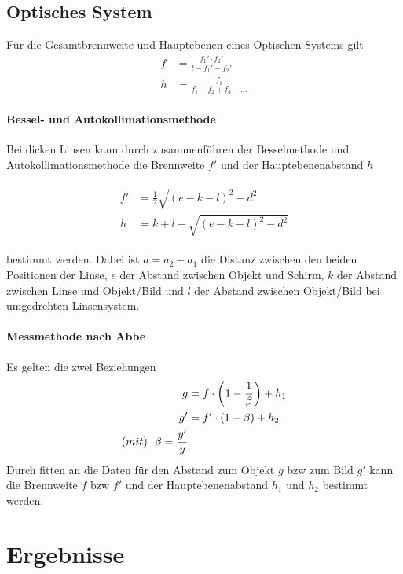 \documentclass[11pt, a4paper]{article}
\begin{document}
    \subsection{Optisches System}

    Für die Gesamtbrennweite und Hauptebenen eines Optischen Systems gilt
    \begin{align}
        f &= \frac{f_1' \cdot f_2'}{t - f_1' - f_2'} \label{eq:brenn}\\
        h &= \frac{f_1}{f_1 + f_2 + f_3 + \dots} \label{eq:ebene}
    \end{align}

    \paragraph*{Bessel- und Autokollimationsmethode}
    Bei dicken Linsen kann durch zusammenführen der Besselmethode und Autokollimationsmethode die Brennweite $f'$ und der Hauptebenenabstand $h$
    
    \begin{align} \begin{split} \label{eq:dicke}
        f' &= \frac{1}{2} \sqrt{(e-k-l)^2 - d^2} \\
        h &= k + l - \sqrt{(e-k-l)^2 - d^2} \end{split}
    \end{align}
        
    bestimmt werden. Dabei ist $d = a_2 - a_1$ die Distanz zwischen den beiden Positionen der Linse, $e$ der Abstand zwischen Objekt und Schirm, $k$ der Abstand zwischen Linse und Objekt/Bild und $l$ der Abstand zwischen Objekt/Bild bei umgedrehten Linsensystem.

    \paragraph{Messmethode nach Abbe}
    Es gelten die zwei Beziehungen
    \begin{align}
        g &= f \cdot \left(1 - \frac{1}{\beta}\right) + h_1 \label{eq:dicke1} \\
        g' &= f' \cdot (1 - \beta) + h_2 \label{eq:dicke2} \\
        \text(mit) \ \ \beta = \frac{y'}{y}
    \end{align}
    Durch fitten an die Daten für den Abstand zum Objekt $g$ bzw zum Bild $g'$ kann die Brennweite $f$ bzw $f'$ und der Hauptebenenabstand $h_1$ und $h_2$ bestimmt werden.


    \section{Ergebnisse}
\end{document}
